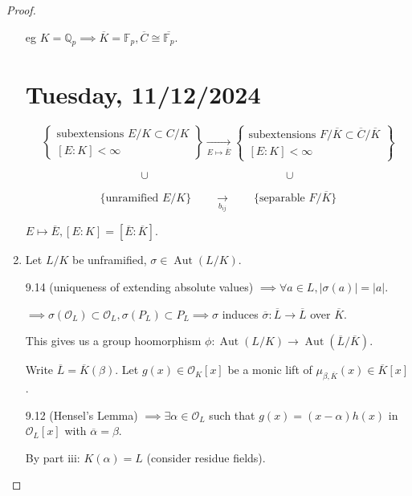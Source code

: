 \documentclass[openany]{amsbook}
\numberwithin{section}{chapter}
\theoremstyle{definition}
\begin{document}
\begin{proof}
\begin{enumerate}[label=\roman*)]
        eg \(K = \mathbb{Q}_p \implies \overline{K} = \mathbb{F}_p, \overline{C} \cong \overline{\mathbb{F}_p}\).

\section*{Tuesday, 11/12/2024}

\[
    \begin{Bmatrix} \text{subextensions } E / K \subset C / K  \\ [E:K] < \infty \end{Bmatrix} \underset{E \mapsto \overline{E}}{\longrightarrow} \begin{Bmatrix} \text{subextensions } F / \overline{K} \subset \overline{C} / \overline{K}  \\ [E:K] < \infty \end{Bmatrix}
\]

\[
    \cup \quad \quad \quad \quad \quad \quad \quad \quad \quad \quad \quad \quad \cup
\]

\[
    \{ \text{unramified } E / K \} \quad \quad \underset{b_{ij}}{\longrightarrow} \quad \quad  \{ \text{separable } F / \overline{K} \}  
\]

\(E \mapsto \overline{E}, [E:K] = [\overline{E} : \overline{K}]\).

    \item Let \(L / K\) be unframified, \(\sigma \in \operatorname{Aut} (L / K)\).

    9.14 (uniqueness of extending absolute values) \(\implies \forall a \in L, \vert \sigma (a) \vert = \vert a \vert\).

    \(\implies \sigma(\mathcal{O}_L) \subset \mathcal{O}_L, \sigma(P_L) \subset P_L \implies \sigma\) induces \(\overline{\sigma} : \overline{L} \to \overline{L}\) over \(\overline{K}\).

    This gives us a group hoomorphism \(\phi: \operatorname{Aut} (L / K) \to \operatorname{Aut} (\overline{L} / \overline{K})\). 

    Write \(\overline{L} = \overline{K} (\beta)\). Let \(g(x) \in \mathcal{O}_K[x]\) be a monic lift of \(\mu_{\beta , \overline{K}}(x) \in \overline{K}[x]\).
    
    9.12 (Hensel's Lemma) \(\implies \exists \alpha \in \mathcal{O}_L\) such that \(g(x) = (x-\alpha)h(x)\) in \(\mathcal{O}_L[x]\) with \(\overline{\alpha} = \beta\). 
    
    By part iii: \(K(\alpha) = L\) (consider residue fields).


\end{enumerate}
\end{proof}
\end{document}
